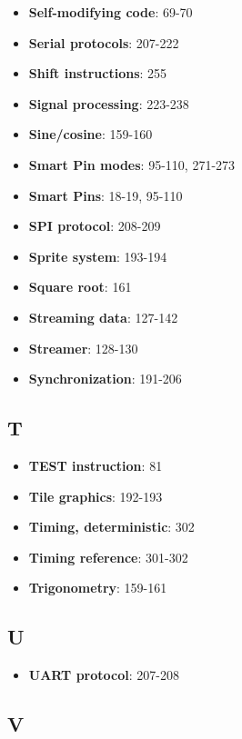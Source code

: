 \documentclass[11pt]{book}
\providecommand{\tightlist}{%
  \setlength{\itemsep}{0pt}\setlength{\parskip}{0pt}}
\begin{document}
\begin{itemize}
\tightlist
\item
  \textbf{Self-modifying code}: 69-70
\item
  \textbf{Serial protocols}: 207-222
\item
  \textbf{Shift instructions}: 255
\item
  \textbf{Signal processing}: 223-238
\item
  \textbf{Sine/cosine}: 159-160
\item
  \textbf{Smart Pin modes}: 95-110, 271-273
\item
  \textbf{Smart Pins}: 18-19, 95-110
\item
  \textbf{SPI protocol}: 208-209
\item
  \textbf{Sprite system}: 193-194
\item
  \textbf{Square root}: 161
\item
  \textbf{Streaming data}: 127-142
\item
  \textbf{Streamer}: 128-130
\item
  \textbf{Synchronization}: 191-206
\end{itemize}

\hypertarget{t}{%
\subsection{T}\label{t}}

\begin{itemize}
\tightlist
\item
  \textbf{TEST instruction}: 81
\item
  \textbf{Tile graphics}: 192-193
\item
  \textbf{Timing, deterministic}: 302
\item
  \textbf{Timing reference}: 301-302
\item
  \textbf{Trigonometry}: 159-161
\end{itemize}

\hypertarget{u}{%
\subsection{U}\label{u}}

\begin{itemize}
\tightlist
\item
  \textbf{UART protocol}: 207-208
\end{itemize}

\hypertarget{v}{%
\subsection{V}\label{v}}
\end{document}
